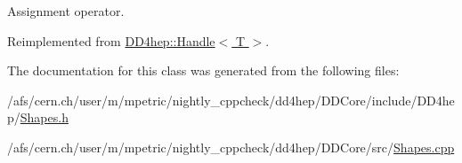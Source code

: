 Assignment operator. 

Reimplemented from \hyperlink{class_d_d4hep_1_1_handle_a9bbf8f498df42e81ad26fb00233505a6}{DD4hep::Handle$<$ T $>$}.

The documentation for this class was generated from the following files:\begin{DoxyCompactItemize}
\item 
/afs/cern.ch/user/m/mpetric/nightly\_\-cppcheck/dd4hep/DDCore/include/DD4hep/\hyperlink{_shapes_8h}{Shapes.h}\item 
/afs/cern.ch/user/m/mpetric/nightly\_\-cppcheck/dd4hep/DDCore/src/\hyperlink{_shapes_8cpp}{Shapes.cpp}\end{DoxyCompactItemize}
